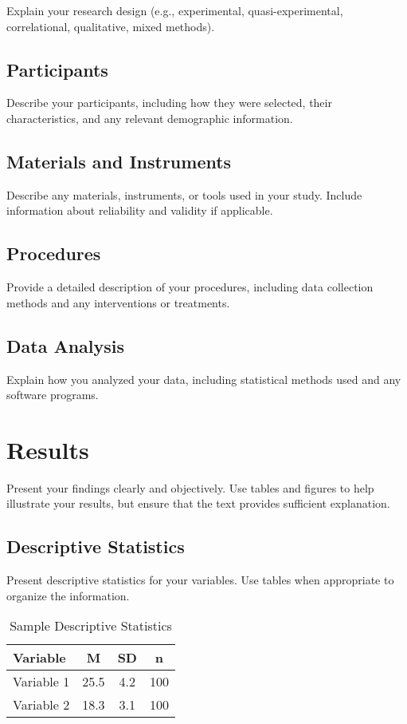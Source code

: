 \documentclass[12pt,letterpaper]{article}
\begin{document}
Explain your research design (e.g., experimental, quasi-experimental, correlational, qualitative, mixed methods).

\subsection{Participants}

Describe your participants, including how they were selected, their characteristics, and any relevant demographic information.

\subsection{Materials and Instruments}

Describe any materials, instruments, or tools used in your study. Include information about reliability and validity if applicable.

\subsection{Procedures}

Provide a detailed description of your procedures, including data collection methods and any interventions or treatments.

\subsection{Data Analysis}

Explain how you analyzed your data, including statistical methods used and any software programs.

\section{Results}

Present your findings clearly and objectively. Use tables and figures to help illustrate your results, but ensure that the text provides sufficient explanation.

\subsection{Descriptive Statistics}

Present descriptive statistics for your variables. Use tables when appropriate to organize the information.

\begin{table}[H]
\centering
\caption{Sample Descriptive Statistics}
\begin{tabular}{lccc}
\toprule
Variable & M & SD & n \\
\midrule
Variable 1 & 25.5 & 4.2 & 100 \\
Variable 2 & 18.3 & 3.1 & 100 \\
\bottomrule
\end{tabular}
\end{table}
\end{document}
